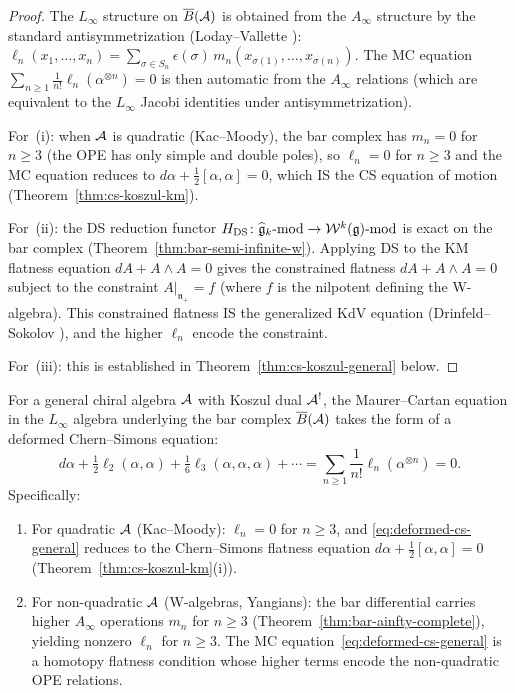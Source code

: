 \begin{proof}
The $L_\infty$ structure on $\overline{B}(\mathcal{A})$ is obtained
from the $A_\infty$ structure by the standard
antisymmetrization (Loday--Vallette \cite[Thm.~10.1.13]{LV12}):
$\ell_n(x_1, \ldots, x_n) = \sum_{\sigma \in S_n}
\epsilon(\sigma)\, m_n(x_{\sigma(1)}, \ldots,
x_{\sigma(n)})$.  The MC equation
$\sum_{n \geq 1} \frac{1}{n!}\ell_n(\alpha^{\otimes n})
= 0$ is then automatic from the $A_\infty$
relations (which are equivalent to the $L_\infty$
Jacobi identities under antisymmetrization).

For~(i): when $\mathcal{A}$ is quadratic (Kac--Moody), the
bar complex has $m_n = 0$ for $n \geq 3$
(the OPE has only simple and double poles), so
$\ell_n = 0$ for $n \geq 3$ and the MC equation
reduces to $d\alpha + \frac{1}{2}[\alpha, \alpha] = 0$,
which IS the CS equation of motion
(Theorem~\ref{thm:cs-koszul-km}).

For~(ii): the DS reduction functor
$H_{\mathrm{DS}}\colon \widehat{\mathfrak{g}}_k\text{-mod}
\to \mathcal{W}^k(\mathfrak{g})\text{-mod}$ is exact on the
bar complex (Theorem~\ref{thm:bar-semi-infinite-w}).
Applying DS to the KM flatness equation
$dA + A \wedge A = 0$ gives the constrained flatness
$dA + A \wedge A = 0$ subject to the constraint
$A|_{\mathfrak{n}_+} = f$ (where $f$ is the nilpotent defining
the W-algebra).  This constrained flatness IS the
generalized KdV equation (Drinfeld--Sokolov \cite{DS}),
and the higher $\ell_n$ encode the constraint.

For~(iii): this is established in
Theorem~\ref{thm:cs-koszul-general} below.
\end{proof}

\begin{theorem}
\label{thm:cs-koszul-general}
For a general chiral algebra $\mathcal{A}$ with Koszul dual $\mathcal{A}^!$,
the Maurer--Cartan equation in the $L_\infty$ algebra
underlying the bar complex $\overline{B}(\mathcal{A})$ takes the form of a
deformed Chern--Simons equation:
\begin{equation}\label{eq:deformed-cs-general}
d\alpha + \tfrac{1}{2}\ell_2(\alpha, \alpha)
+ \tfrac{1}{6}\ell_3(\alpha, \alpha, \alpha)
+ \cdots
= \sum_{n \geq 1} \frac{1}{n!}\ell_n(\alpha^{\otimes n})
= 0.
\end{equation}
Specifically:
\begin{enumerate}[label=\textup{(\roman*)}]
\item For quadratic $\mathcal{A}$
  \textup{(}Kac--Moody\textup{)}: $\ell_n = 0$ for
  $n \geq 3$, and \eqref{eq:deformed-cs-general} reduces
  to the Chern--Simons flatness equation
  $d\alpha + \frac{1}{2}[\alpha, \alpha] = 0$
  \textup{(}Theorem~\textup{\ref{thm:cs-koszul-km}(i))}.
\item For non-quadratic $\mathcal{A}$
  \textup{(}W-algebras, Yangians\textup{)}: the bar
  differential carries higher $A_\infty$ operations
  $m_n$ for $n \geq 3$
  \textup{(}Theorem~\textup{\ref{thm:bar-ainfty-complete}}\textup{)},
  yielding nonzero $\ell_n$ for $n \geq 3$.
  The MC equation~\eqref{eq:deformed-cs-general} is a
  homotopy flatness condition whose higher terms encode
  the non-quadratic OPE relations.
\end{enumerate}
\end{theorem}

